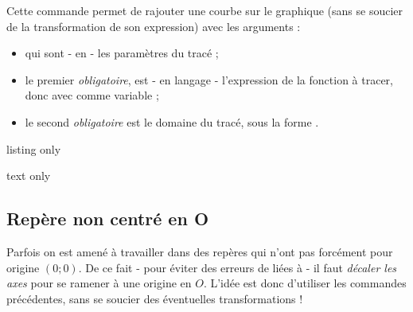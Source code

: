 \begin{cautionblock}
Cette commande permet de rajouter une courbe sur le graphique (sans se soucier de la transformation de son expression) avec les arguments :

\begin{itemize}
	\item {} qui sont - en \TikZ{} - les paramètres du tracé ;
	\item le premier \textit{obligatoire}, est - en langage \TikZ{} - l'expression de la fonction à tracer, donc avec  comme variable ;
	\item le second \textit{obligatoire} est le domaine du tracé, sous la forme .
\end{itemize}
\vspace*{-\baselineskip}\leavevmode
\end{cautionblock}

\begin{PresCodeTexPL}{listing only}
\end{PresCodeTexPL}

\begin{PresCodeSortiePL}{text only}
\end{PresCodeSortiePL}

\subsection{Repère non centré en O}

\begin{tipblock}
Parfois on est amené à travailler dans des repères qui n'ont pas forcément pour origine $(0;0)$. De ce fait - pour éviter des erreurs de  liées à \TikZ{} - il faut \textit{décaler les axes} pour se ramener à une origine en $O$. L'idée est donc d'utiliser les commandes précédentes, sans se soucier des éventuelles transformations !
\end{tipblock}


